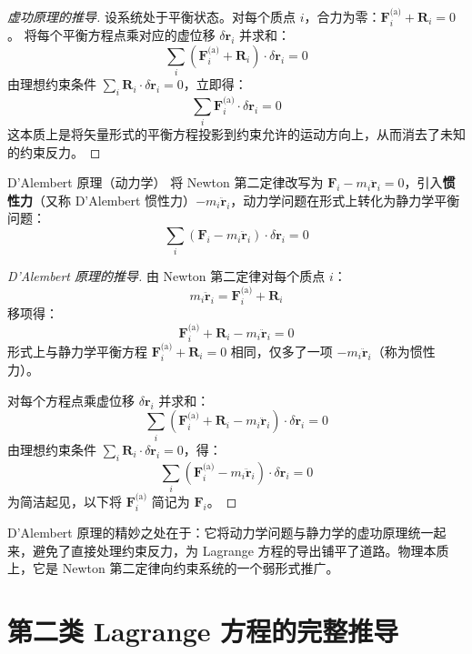 \begin{proof}[虚功原理的推导]
	设系统处于平衡状态。对每个质点 $i$，合力为零：$\mathbf{F}_i^{\text{(a)}} + \mathbf{R}_i = 0$。
	将每个平衡方程点乘对应的虚位移 $\delta \mathbf{r}_i$ 并求和：
	\[
	\sum_i \left( \mathbf{F}_i^{\text{(a)}} + \mathbf{R}_i \right) \cdot \delta \mathbf{r}_i = 0
	\]
	由理想约束条件 $\sum_i \mathbf{R}_i \cdot \delta \mathbf{r}_i = 0$，立即得：
	\[
	\sum_i \mathbf{F}_i^{\text{(a)}} \cdot \delta \mathbf{r}_i = 0
	\]
	这本质上是将矢量形式的平衡方程投影到约束允许的运动方向上，从而消去了未知的约束反力。
\end{proof}

\begin{theorem}{D'Alembert 原理（动力学）}
	将 Newton 第二定律改写为 $\mathbf{F}_i - m_i \ddot{\mathbf{r}}_i = 0$，引入\textbf{惯性力}（又称 D'Alembert 惯性力）$-m_i \ddot{\mathbf{r}}_i$，动力学问题在形式上转化为静力学平衡问题：
	\[
	\sum_{i} (\mathbf{F}_i - m_i \ddot{\mathbf{r}}_i) \cdot \delta \mathbf{r}_i = 0
	\]
\end{theorem}

\begin{proof}[D'Alembert 原理的推导]
	由 Newton 第二定律对每个质点 $i$：
	\[
	m_i \ddot{\mathbf{r}}_i = \mathbf{F}_i^{\text{(a)}} + \mathbf{R}_i
	\]
	移项得：
	\[
	\mathbf{F}_i^{\text{(a)}} + \mathbf{R}_i - m_i \ddot{\mathbf{r}}_i = 0
	\]
	形式上与静力学平衡方程 $\mathbf{F}_i^{\text{(a)}} + \mathbf{R}_i = 0$ 相同，仅多了一项 $-m_i \ddot{\mathbf{r}}_i$（称为惯性力）。
	
	对每个方程点乘虚位移 $\delta \mathbf{r}_i$ 并求和：
	\[
	\sum_i \left( \mathbf{F}_i^{\text{(a)}} + \mathbf{R}_i - m_i \ddot{\mathbf{r}}_i \right) \cdot \delta \mathbf{r}_i = 0
	\]
	由理想约束条件 $\sum_i \mathbf{R}_i \cdot \delta \mathbf{r}_i = 0$，得：
	\[
	\sum_i \left( \mathbf{F}_i^{\text{(a)}} - m_i \ddot{\mathbf{r}}_i \right) \cdot \delta \mathbf{r}_i = 0
	\]
	为简洁起见，以下将 $\mathbf{F}_i^{\text{(a)}}$ 简记为 $\mathbf{F}_i$。
\end{proof}

\begin{remark}
	D'Alembert 原理的精妙之处在于：它将动力学问题与静力学的虚功原理统一起来，避免了直接处理约束反力，为 Lagrange 方程的导出铺平了道路。物理本质上，它是 Newton 第二定律向约束系统的一个弱形式推广。
\end{remark}

\section{第二类 Lagrange 方程的完整推导}

